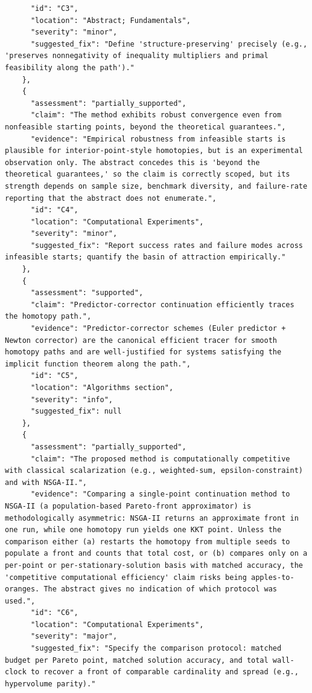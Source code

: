\documentclass[11pt]{article}
\begin{document}
\begin{verbatim}
      "id": "C3",
      "location": "Abstract; Fundamentals",
      "severity": "minor",
      "suggested_fix": "Define 'structure-preserving' precisely (e.g., 'preserves nonnegativity of inequality multipliers and primal feasibility along the path')."
    },
    {
      "assessment": "partially_supported",
      "claim": "The method exhibits robust convergence even from nonfeasible starting points, beyond the theoretical guarantees.",
      "evidence": "Empirical robustness from infeasible starts is plausible for interior-point-style homotopies, but is an experimental observation only. The abstract concedes this is 'beyond the theoretical guarantees,' so the claim is correctly scoped, but its strength depends on sample size, benchmark diversity, and failure-rate reporting that the abstract does not enumerate.",
      "id": "C4",
      "location": "Computational Experiments",
      "severity": "minor",
      "suggested_fix": "Report success rates and failure modes across infeasible starts; quantify the basin of attraction empirically."
    },
    {
      "assessment": "supported",
      "claim": "Predictor-corrector continuation efficiently traces the homotopy path.",
      "evidence": "Predictor-corrector schemes (Euler predictor + Newton corrector) are the canonical efficient tracer for smooth homotopy paths and are well-justified for systems satisfying the implicit function theorem along the path.",
      "id": "C5",
      "location": "Algorithms section",
      "severity": "info",
      "suggested_fix": null
    },
    {
      "assessment": "partially_supported",
      "claim": "The proposed method is computationally competitive with classical scalarization (e.g., weighted-sum, epsilon-constraint) and with NSGA-II.",
      "evidence": "Comparing a single-point continuation method to NSGA-II (a population-based Pareto-front approximator) is methodologically asymmetric: NSGA-II returns an approximate front in one run, while one homotopy run yields one KKT point. Unless the comparison either (a) restarts the homotopy from multiple seeds to populate a front and counts that total cost, or (b) compares only on a per-point or per-stationary-solution basis with matched accuracy, the 'competitive computational efficiency' claim risks being apples-to-oranges. The abstract gives no indication of which protocol was used.",
      "id": "C6",
      "location": "Computational Experiments",
      "severity": "major",
      "suggested_fix": "Specify the comparison protocol: matched budget per Pareto point, matched solution accuracy, and total wall-clock to recover a front of comparable cardinality and spread (e.g., hypervolume parity)."

\end{verbatim}
\end{document}

